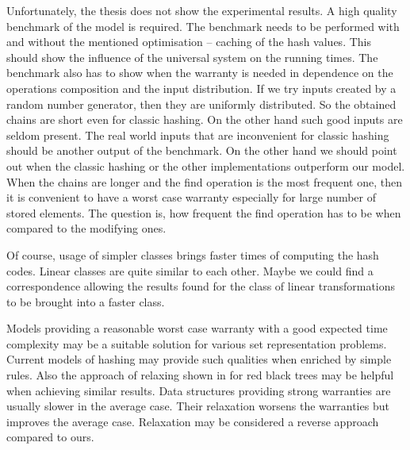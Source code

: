 Unfortunately, the thesis does not show the experimental results. A high quality benchmark of the model is required. The benchmark needs to be performed with and without the mentioned optimisation -- caching of the hash values. This should show the influence of the universal system on the running times. The benchmark also has to show when the warranty is needed in dependence on the operations composition and the input distribution. If we try inputs created by a random number generator, then they are uniformly distributed. So the obtained chains are short even for classic hashing. On the other hand such good inputs are seldom present. The real world inputs that are inconvenient for classic hashing should be another output of the benchmark. On the other hand we should point out when the classic hashing or the other implementations outperform our model. When the chains are longer and the find operation is the most frequent one, then it is convenient to have a worst case warranty especially for large number of stored elements. The question is, how frequent the find operation has to be when compared to the modifying ones.

Of course, usage of simpler classes brings faster times of computing the hash codes. Linear classes are quite similar to each other. Maybe we could find a correspondence allowing the results found for the class of linear transformations to be brought into a faster class.

Models providing a reasonable worst case warranty with a good expected time complexity may be a suitable solution for various set representation problems. Current models of hashing may provide such qualities when enriched by simple rules. Also the approach of relaxing shown in \cite{752883} for red black trees may be helpful when achieving similar results.  Data structures providing strong warranties are usually slower in the average case. Their relaxation worsens the warranties but improves the average case. Relaxation may be considered a reverse approach compared to ours.

